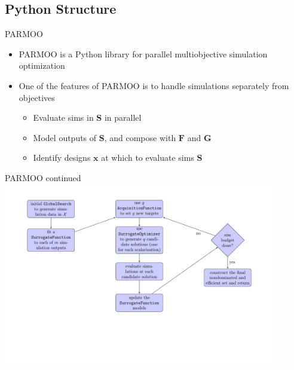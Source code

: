 \documentclass[aspectratio=169]{beamer}
\newcommand{\vx}{\mathbf{x}}
\newcommand{\vF}{\mathbf{F}}
\newcommand{\vG}{\mathbf{G}}
\newcommand{\vS}{\mathbf{S}}
\begin{document}
\subsection{Python Structure}

\begin{frame}{PARMOO}
\begin{itemize}
\item PARMOO is a Python library for parallel
multiobjective simulation optimization
\item One of the features of PARMOO is to handle simulations separately
from objectives
\begin{itemize}
\item Evaluate sims in $\vS$ in parallel
\item Model outputs of $\vS$, and compose with $\vF$ and $\vG$
\item Identify designs $\vx$ at which to evaluate sims $\vS$
\end{itemize}
\end{itemize}
\end{frame}

\begin{frame}{PARMOO continued}
\includegraphics[width=0.9\textwidth]{algorithm-chart.pdf}
\end{frame}
\end{document}
